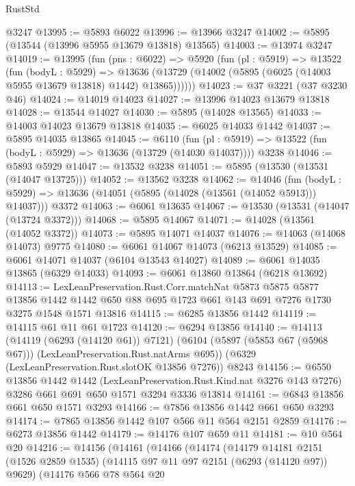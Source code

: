 \begin{lexlean}{RustStd}
\begin{coremodule}
{{    @3247
@13995 := @5893 @6022
@13996 := @13966 @3247
@14002 := @5895 (@13544 (@13996 @5955 @13679 @13818) @13565)
@14003 := @13974 @3247
@14019 := @13995
    (fun (pns : @6022) =>
    @5920
      (fun (pl : @5919) =>
      @13522
        (fun (bodyL : @5929) =>
        @13636 (@13729 (@14002 (@5895 (@6025 (@14003 @5955 @13679 @13818) @1442) @13865))))))
@14023 := @37 @3221 (@37 @3230 @46)
@14024 := @14019 @14023
@14027 := @13996 @14023 @13679 @13818
@14028 := @13544 @14027
@14030 := @5895 (@14028 @13565)
@14033 := @14003 @14023 @13679 @13818
@14035 := @6025 @14033 @1442
@14037 := @5895 @14035 @13865
@14045 := @6110
    (fun (pl : @5919) => @13522 (fun (bodyL : @5929) => @13636 (@13729 (@14030 @14037))))
    @3238
@14046 := @5893 @5929
@14047 := @13532 @3238
@14051 := @5895 (@13530 (@13531 (@14047 @13725)))
@14052 := @13562 @3238
@14062 := @14046
    (fun (bodyL : @5929) => @13636 (@14051 (@5895 (@14028 (@13561 (@14052 @5913))) @14037)))
    @3372
@14063 := @6061 @13635
@14067 := @13530 (@13531 (@14047 (@13724 @3372)))
@14068 := @5895 @14067
@14071 := @14028 (@13561 (@14052 @3372))
@14073 := @5895 @14071 @14037
@14076 := @14063 (@14068 @14073) @9775
@14080 := @6061 @14067 @14073 (@6213 @13529)
@14085 := @6061 @14071 @14037 (@6104 @13543 @14027)
@14089 := @6061 @14035 @13865 (@6329 @14033)
@14093 := @6061 @13860 @13864 (@6218 @13692)
@14113 := LexLeanPreservation.Rust.Corr.matchNat
    @5873
    @5875
    @5877
    @13856
    @1442
    @1442
    @650
    @88
    @695
    @1723
    @661
    @143
    @691
    @7276
    @1730
    @3275
    @1548
    @1571
    @13816
@14115 := @6285 @13856 @1442
@14119 := @14115 @61 @11 @61 @1723
@14120 := @6294 @13856
@14140 := @14113
    (@14119 (@6293 (@14120 @61)) @7121)
    (@6104 (@5897 (@5853 @67 (@5968 @67))) (LexLeanPreservation.Rust.natArms @695))
    (@6329 (LexLeanPreservation.Rust.slotOK @13856 @7276))
    @8243
@14156 := @6550
    @13856
    @1442
    @1442
    (LexLeanPreservation.Rust.Kind.nat @3276 @143 @7276)
    @3286
    @661
    @691
    @650
    @1571
    @3294
    @3336
    @13814
@14161 := @6843 @13856 @661 @650 @1571 @3293
@14166 := @7856 @13856 @1442 @661 @650 @3293
@14174 := @7865 @13856 @1442 @107 @566 @11 @564 @2151 @2859
@14176 := @6273 @13856 @1442
@14179 := @14176 @107 @659 @11
@14181 := @10 @564 @20
@14216 := @14156
    (@14161
      (@14166
        (@14174
          (@14179
            @14181
            @2151
            (@1526 @2859 @1535)
            (@14115 @97 @11 @97 @2151 (@6293 (@14120 @97)) @9629)
            (@14176
              @566
              @78
              @564
              @20
}}
\end{coremodule}
\end{lexlean}
